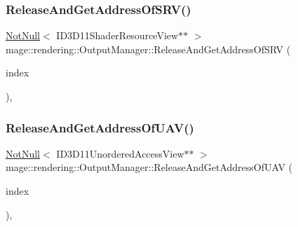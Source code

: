 \subsubsection{\texorpdfstring{Release\+And\+Get\+Address\+Of\+S\+R\+V()}{ReleaseAndGetAddressOfSRV()}}
{\footnotesize\ttfamily \hyperlink{namespacemage_a8769f9d670d6b585ea306cb1062af94b}{Not\+Null}$<$ I\+D3\+D11\+Shader\+Resource\+View$\ast$$\ast$ $>$ mage\+::rendering\+::\+Output\+Manager\+::\+Release\+And\+Get\+Address\+Of\+S\+RV (\begin{DoxyParamCaption}\item[{\hyperlink{classmage_1_1rendering_1_1_output_manager_a941f1b35a83ee0ce190494523ec0fe63}{S\+R\+V\+Index}}]{index }\end{DoxyParamCaption})\hspace{0.3cm}{\ttfamily [private]}, {\ttfamily [noexcept]}}

\hypertarget{classmage_1_1rendering_1_1_output_manager_a79ec82aadfe89ea1a9875567d9bbb74a}{}\label{classmage_1_1rendering_1_1_output_manager_a79ec82aadfe89ea1a9875567d9bbb74a} 
\subsubsection{\texorpdfstring{Release\+And\+Get\+Address\+Of\+U\+A\+V()}{ReleaseAndGetAddressOfUAV()}}
{\footnotesize\ttfamily \hyperlink{namespacemage_a8769f9d670d6b585ea306cb1062af94b}{Not\+Null}$<$ I\+D3\+D11\+Unordered\+Access\+View$\ast$$\ast$ $>$ mage\+::rendering\+::\+Output\+Manager\+::\+Release\+And\+Get\+Address\+Of\+U\+AV (\begin{DoxyParamCaption}\item[{\hyperlink{classmage_1_1rendering_1_1_output_manager_a71b3797fef957312f92736f15b7ada3e}{U\+A\+V\+Index}}]{index }\end{DoxyParamCaption})\hspace{0.3cm}{\ttfamily [private]}, {\ttfamily [noexcept]}}

\hypertarget{classmage_1_1rendering_1_1_output_manager_aca32d0307be3acfaa8f5a20fa24b6934}{}\label{classmage_1_1rendering_1_1_output_manager_aca32d0307be3acfaa8f5a20fa24b6934} 
